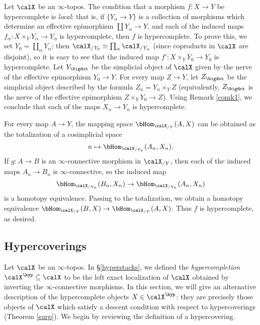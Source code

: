 \begin{remark}\label{suchlike}
Let $\calX$ be an $\infty$-topos. The condition that a morphism $f: X \rightarrow Y$ be hypercomplete is {\em local}: that is, if $\{ Y_{\alpha} \rightarrow Y \}$ is a collection of morphisms which
determine an effective epimorphism $\coprod Y_{\alpha} \rightarrow Y$, and each of the induced maps
$f_{\alpha}: X \times_{Y} Y_{\alpha} \rightarrow Y_{\alpha}$ is hypercomplete, then $f$ is hypercomplete. To prove this, we set $Y_0 = \coprod_{\alpha} Y_{\alpha}$; then
$\calX_{/Y_0} \simeq \prod_{ \alpha} \calX_{/Y_{\alpha}}$ (since coproducts in $\calX$ are disjoint),
so it is easy to see that the induced map $f': X \times_{Y} Y_0 \rightarrow Y_0$ is hypercomplete.
Let $Y_{\bigdot}$ be the simplicial object of $\calX$ given by the \Cech nerve of the effective epimorphism $Y_0 \rightarrow Y$. For every map $Z \rightarrow Y$, let $Z_{\bigdot}$ be
the simplicial object described by the formula
$Z_{n} = Y_{n} \times_{Y} Z$
(equivalently, $Z_{\bigdot}$ is the \Cech nerve of the effective epimorphism $Z \times_{Y} Y_0 \rightarrow Z$). Using Remark \ref{comk1}, we conclude that each of the maps $X_{n} \rightarrow Y_{n}$ is hypercomplete.

For every map $A \rightarrow Y$, the mapping space
$\bHom_{ \calX_{/Y}}( A, X)$ can be obtained as the totalization of a cosimplicial space
$$ n \mapsto \bHom_{ \calX_{/Y_n} }( A_{n}, X_n).$$
If $g: A \rightarrow B$ is an $\infty$-connective morphism in $\calX_{/Y}$, then
each of the induced maps $A_{n} \rightarrow B_{n}$ is $\infty$-connective, so the induced map
$$ \bHom_{ \calX_{/Y_n}}( B_{n}, X_{n} ) \rightarrow \bHom_{ \calX_{/Y_{n}}}( A_{n}, X_n)$$
is a homotopy equivalence. Passing to the totalization, we obtain a homotopy equivalence
$\bHom_{\calX_{/Y}}(B,X) \rightarrow \bHom_{\calX_{/Y}}( A, X)$. Thus $f$ is hypercomplete, as desired.
\end{remark}


\subsection{Hypercoverings}\label{hcovh}

Let $\calX$ be an $\infty$-topos. In \S \ref{hyperstacks}, we defined the {\em hypercompletion}
$\calX^{\hyp} \subseteq \calX$ to be the left exact localization of $\calX$ obtained by inverting the $\infty$-connective morphisms. In this section, we will give an alternative description of the hypercomplete objects $X \in \calX^{\hyp}$: they are precisely those objects of $\calX$ which satisfy a descent condition with respect to hypercoverings (Theorem \ref{surp}). We begin by reviewing the definition of a hypercovering.

